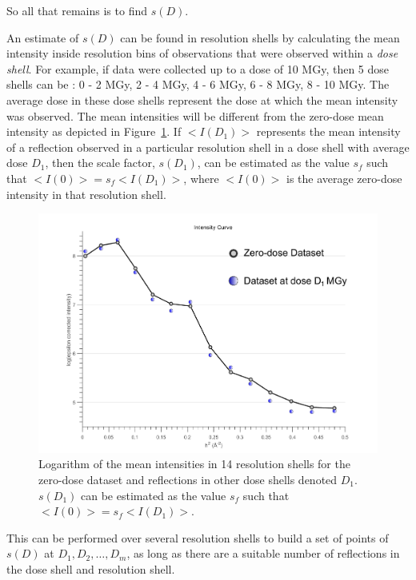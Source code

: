So all that remains is to find $s(D)$.

An estimate of $s(D)$ can be found in resolution shells by calculating the mean intensity inside resolution bins of observations that were observed within a \textit{dose shell}.
For example, if data were collected up to a dose of 10 MGy, then 5 dose shells can be : 0 - 2 MGy, 2 - 4 MGy, 4 - 6 MGy, 6 - 8 MGy, 8 - 10 MGy.
The average dose in these dose shells represent the dose at which the mean intensity was observed.
The mean intensities will be different from the zero-dose mean intensity as depicted in Figure~\ref{fig:mean intensity in resolution shells, various doses - Extrapolation method}.
If $<I(D_1)>$ represents the mean intensity of a reflection observed in a particular resolution shell in a dose shell with average dose $D_1$, then the scale factor, $s(D_1)$, can be estimated as the value $s_f$ such that $<I(0)> = s_f <I(D_1)>$, where $<I(0)>$ is the average zero-dose intensity in that resolution shell.
\begin{figure}
  \centering
    \includegraphics[width=1\textwidth]{figures/zde/extrapolationscaling_scale_points.pdf}
    \caption{Logarithm of the mean intensities in 14 resolution shells for the zero-dose dataset and reflections in other dose shells denoted $D_1$.
    $s(D_1)$ can be estimated as the value $s_f$ such that $<I(0)> = s_f <I(D_1)>$.}
    \label{fig:mean intensity in resolution shells, various doses - Extrapolation method}
\end{figure}
This can be performed over several resolution shells to build a set of points of $s(D)$ at $D_1, D_2,\ldots, D_m$, as long as there are a suitable number of reflections in the dose shell and resolution shell.
